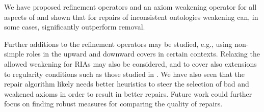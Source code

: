 
We have proposed refinement operators and an axiom weakening operator for all aspects of \SROIQ and shown that for repairs of inconsistent ontologies weakening can, in some cases, significantly outperform removal.

Further additions to the refinement operators may be studied, e.g., using non-simple roles in the upward and downward covers in certain contexts. Relaxing the allowed weakening for RIAs may also be considered, and to cover also extensions to regularity conditions such as those studied in \cite{DBLP:conf/cade/Kazakov10}. We have also seen that the repair algorithm likely needs better heuristics to steer the selection of bad and weakened axioms in order to result in better repairs. Future work could further focus on finding robust measures for comparing the quality of repairs.


